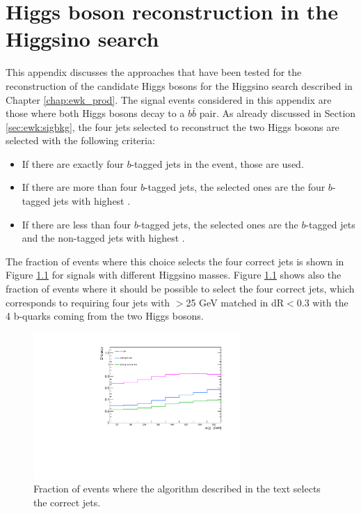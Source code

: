 \chapter{Higgs boson reconstruction in the Higgsino search}
\label{app:higgs}

This appendix discusses the approaches that have been tested for the reconstruction of the 
candidate Higgs bosons for the Higgsino search described in Chapter \ref{chap:ewk_prod}. 
The signal events considered in this appendix are those where both Higgs bosons decay to a $b\bar{b}$ pair. 
As already discussed in Section \ref{sec:ewk:sigbkg}, the four jets selected to reconstruct the two Higgs bosons 
are selected with the following criteria:

\begin{itemize}
\item If there are exactly four $b$-tagged jets in the event, those are used.
\item If there are more than four $b$-tagged jets, the selected ones are the four $b$-tagged jets with highest \pt.
\item If there are less than four $b$-tagged jets, the selected ones are the $b$-tagged jets and the non-tagged jets with highest \pt.
\end{itemize}

The fraction of events where this choice selects the four correct jets is shown in Figure \ref{fig:h_reco_match_possible} 
for signals with different Higgsino masses. 
Figure \ref{fig:h_reco_match_possible} shows also the fraction of events where it should be possible to select the four correct jets, 
which corresponds to requiring four jets with \pt $>$25 GeV  matched in dR$<$0.3 with the 4 b-quarks coming from the two Higgs bosons.

\begin{figure}[h]
\centering
\includegraphics[width=0.7\textwidth]{figures/h_reco/match_possible.pdf}
\caption{Fraction of events where the algorithm described in the text selects the correct jets.}
\label{fig:h_reco_match_possible}
\end{figure}

